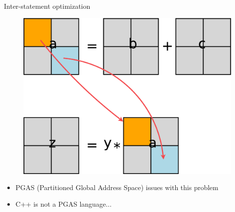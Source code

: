 \documentclass[svgnames]{beamer}
\begin{document}
\begin{frame}{Inter-statement optimization}
\begin{figure}
\includegraphics[width=.5\textwidth]{images/inter-exp-fut}
\end{figure}
\begin{itemize}
	\item PGAS (Partitioned Global Address Space) issues with this problem
	\item C++ is not a PGAS language...
\end{itemize}
\end{frame}
%		
\end{document}
